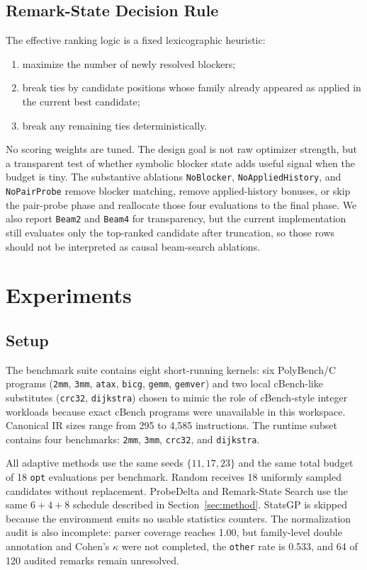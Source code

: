 \documentclass{article}
\newcommand{\method}{Remark-State Search}
\begin{document}
\subsection{Remark-State Decision Rule}

The effective ranking logic is a fixed lexicographic heuristic:
\begin{enumerate}
  \item maximize the number of newly resolved blockers;
  \item break ties by candidate positions whose family already appeared as applied in the current best candidate;
  \item break any remaining ties deterministically.
\end{enumerate}
No scoring weights are tuned. The design goal is not raw optimizer strength, but a transparent test of whether symbolic blocker state adds useful signal when the budget is tiny. The substantive ablations \texttt{NoBlocker}, \texttt{NoAppliedHistory}, and \texttt{NoPairProbe} remove blocker matching, remove applied-history bonuses, or skip the pair-probe phase and reallocate those four evaluations to the final phase. We also report \texttt{Beam2} and \texttt{Beam4} for transparency, but the current implementation still evaluates only the top-ranked candidate after truncation, so those rows should not be interpreted as causal beam-search ablations.

\section{Experiments}
\label{sec:experiments}

\subsection{Setup}

The benchmark suite contains eight short-running kernels: six PolyBench/C programs (\texttt{2mm}, \texttt{3mm}, \texttt{atax}, \texttt{bicg}, \texttt{gemm}, \texttt{gemver}) \citep{pouchet2012polybench} and two local cBench-like substitutes (\texttt{crc32}, \texttt{dijkstra}) chosen to mimic the role of cBench-style integer workloads \citep{fursin2010cbench} because exact cBench programs were unavailable in this workspace. Canonical IR sizes range from 295 to 4{,}585 instructions. The runtime subset contains four benchmarks: \texttt{2mm}, \texttt{3mm}, \texttt{crc32}, and \texttt{dijkstra}.

All adaptive methods use the same seeds $\{11,17,23\}$ and the same total budget of 18 \texttt{opt} evaluations per benchmark. Random receives 18 uniformly sampled candidates without replacement. ProbeDelta and \method{} use the same $6+4+8$ schedule described in Section~\ref{sec:method}. StatsGP is skipped because the environment emits no usable statistics counters. The normalization audit is also incomplete: parser coverage reaches 1.00, but family-level double annotation and Cohen's $\kappa$ were not completed, the \texttt{other} rate is 0.533, and 64 of 120 audited remarks remain unresolved.
\end{document}
